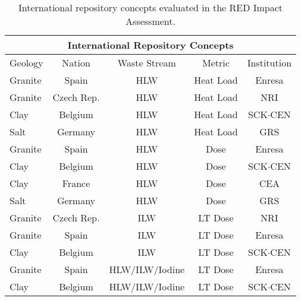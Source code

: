 
\begin{table}[h!]
  \centering
  \footnotesize{
  \begin{tabular}{|l|c|c|c|c|}
    \multicolumn{5}{c}{\textbf{International Repository Concepts}}\\
    \hline
    Geology     & Nation      & Waste Stream   & Metric    & Institution \\
    \hline 
    Granite     & Spain       & HLW            & Heat Load & Enresa  \\
    Granite     & Czech Rep.  & HLW            & Heat Load & NRI \\
    Clay        & Belgium     & HLW            & Heat Load & SCK$\cdot$CEN \\
    Salt        & Germany     & HLW            & Heat Load & GRS \\
    Granite     & Spain       & HLW            & Dose      & Enresa  \\
    Clay        & Belgium     & HLW            & Dose      & SCK$\cdot$CEN \\
    Clay        & France      & HLW            & Dose      & CEA \\
    Salt        & Germany     & HLW            & Dose      & GRS  \\
    Granite     & Czech Rep.  & ILW            & LT Dose   & NRI  \\
    Granite     & Spain       & ILW            & LT Dose   & Enresa  \\
    Clay        & Belgium     & ILW            & LT Dose   & SCK$\cdot$CEN  \\
    Granite     & Spain       & HLW/ILW/Iodine & LT Dose   & Enresa \\
    Clay        & Belgium     & HLW/ILW/Iodine & LT Dose   & SCK$\cdot$CEN \\
    \hline
  \end{tabular}
  \caption[International repository concepts.]{International repository concepts evaluated in the RED Impact 
  Assessment.\cite{von_lensa_red-impact_2008}}
  \label{tab:red}
  }
\end{table}


